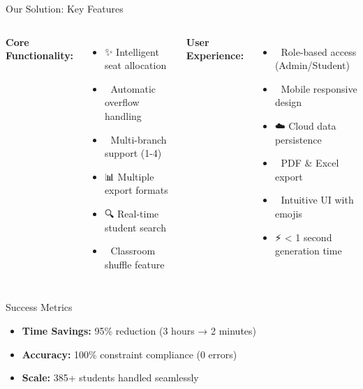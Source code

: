 \documentclass[aspectratio=169]{beamer}
\begin{document}
\begin{frame}{Our Solution: Key Features}
\begin{columns}
\textbf{Core Functionality:}
\begin{itemize}
    \item ✨ Intelligent seat allocation
    \item 🔄 Automatic overflow handling
    \item 🎯 Multi-branch support (1-4)
    \item 📊 Multiple export formats
    \item 🔍 Real-time student search
    \item 🔀 Classroom shuffle feature
\end{itemize}

\textbf{User Experience:}
\begin{itemize}
    \item 🔐 Role-based access (Admin/Student)
    \item 📱 Mobile responsive design
    \item ☁️ Cloud data persistence
    \item 📄 PDF \& Excel export
    \item 🎨 Intuitive UI with emojis
    \item ⚡ < 1 second generation time
\end{itemize}
\end{columns}

\vspace{0.5cm}
\begin{block}{Success Metrics}
\begin{itemize}
    \item \textbf{Time Savings:} 95\% reduction (3 hours → 2 minutes)
    \item \textbf{Accuracy:} 100\% constraint compliance (0 errors)
    \item \textbf{Scale:} 385+ students handled seamlessly
\end{itemize}
\end{block}
\end{frame}
\end{document}
